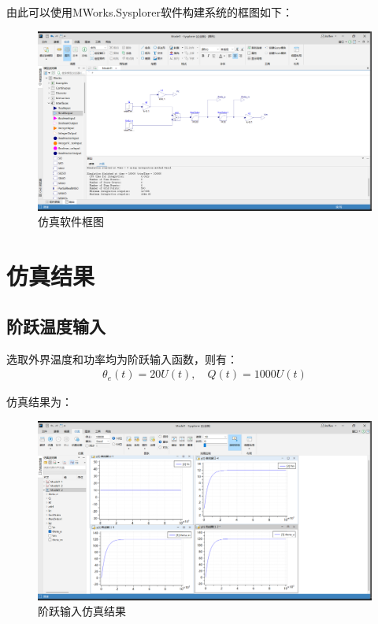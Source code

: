 \documentclass[11pt]{article}
\begin{document}
由此可以使用MWorks.Sysplorer软件构建系统的框图如下：
\begin{figure}[H]
  \centering
  \includegraphics[width=1.0\textwidth]{仿真软件框图.png}
  \caption{仿真软件框图}
  \label{fig:仿真软件框图}
\end{figure}
\section{仿真结果}
\subsection{阶跃温度输入}
选取外界温度和功率均为阶跃输入函数，则有：
\begin{align*}
 \theta_e(t)=20U(t),\quad Q(t)=1000U(t)
\end{align*}\par
仿真结果为：
\begin{figure}[H]
  \centering
  \includegraphics[width=1.0\textwidth]{阶跃输入仿真.png}
  \caption{阶跃输入仿真结果}
  \label{fig:阶跃输入仿真}
\end{figure}
\end{document}
